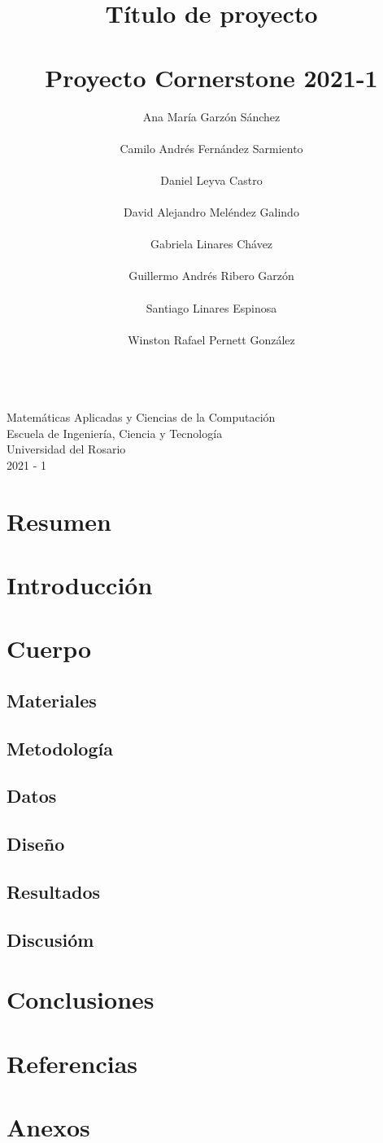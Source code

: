 \documentclass{article}
\title{Título de proyecto
\\ \\Proyecto Cornerstone 2021-1}
\author{Ana María Garzón Sánchez
\\\\Camilo Andrés Fernández Sarmiento
\\\\Daniel Leyva Castro
\\\\David Alejandro Meléndez Galindo
\\\\Gabriela Linares Chávez
\\\\Guillermo Andrés Ribero Garzón
\\\\Santiago Linares Espinosa
\\\\Winston Rafael Pernett González}
\date{}
\begin{document}
\maketitle

\centering

\large

 \\Matemáticas Aplicadas y Ciencias de la Computación
 \\Escuela de Ingeniería, Ciencia y Tecnología
 \\Universidad del Rosario
 \\2021 - 1
 
 \pagebreak

\begin{flushleft}
\tableofcontents
\section{Resumen}
\section{Introducción}
\section{Cuerpo}
    \subsection{Materiales}
    \subsection{Metodología}
    \subsection{Datos}
    \subsection{Diseño}
    \subsection{Resultados}
    \subsection{Discusióm}
\section{Conclusiones}
\section{Referencias}
\section{Anexos}
\end{flushleft}
\end{document}
